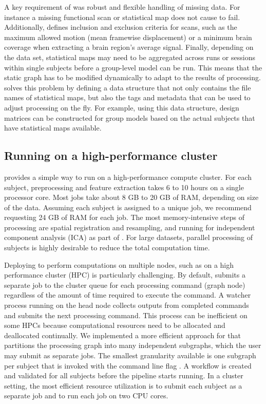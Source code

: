A key requirement of  was robust and flexible handling of
missing data. For instance a missing functional scan or statistical map
does not cause  to fail. Additionally, 
defines inclusion and exclusion criteria for scans, such as the maximum
allowed motion (mean framewise displacement) or a minimum brain coverage
when extracting a brain region's average signal. Finally, depending on the
data set, statistical maps may need to be aggregated across runs or
sessions within single subjects before a group-level model can be run. This
means that the static graph has to be modified dynamically to adapt to the
results of processing.  solves this problem by defining a
data structure that not only contains the file names of statistical maps,
but also the tags and metadata that can be used to adjust processing on the
fly. For example, using this data structure, design matrices can be
constructed for group models based on the actual subjects that have
statistical maps available.

\subsection{Running on a high-performance cluster}

 provides a simple way to run on a high-performance compute
cluster. For each subject, preprocessing and feature extraction takes 6 to
10 hours on a single processor core. Most jobs take about 8 GB to 20 GB of
RAM, depending on size of the data. Assuming each subject is assigned to a
unique job, we recommend requesting 24 GB of RAM for each job. The most
memory-intensive steps of processing are spatial registration and
resampling, and running  for independent component
analysis (ICA) as part of 
\parencite{10.1016/j.neuroimage.2015.02.064}. For large datasets, parallel
processing of subjects is highly desirable to reduce the total computation
time.

Deploying  to perform computations on multiple nodes, such as
on a high performance cluster (HPC) is particularly challenging. By
default,  submits a separate job to the cluster queue for each
processing command (graph node) regardless of the amount of time required
to execute the command. A watcher process running on the head node collects
outputs from completed commands and submits the next processing command.
This process can be inefficient on some HPCs because computational
resources need to be allocated and deallocated continually. We implemented
a more efficient approach for  that partitions the
processing graph into many independent subgraphs, which the user may submit
as separate jobs. The smallest granularity available is one subgraph per
subject that is invoked with the command line flag .
A  workflow is created and validated for all subjects before
the pipeline starts running. In a cluster setting, the most efficient
resource utilization is to submit each subject as a separate job and to run
each job on two CPU cores.

